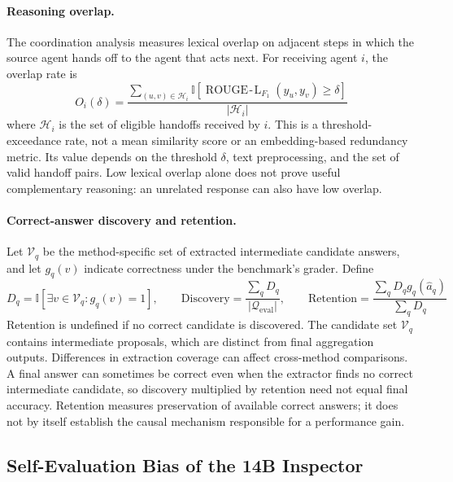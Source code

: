 \paragraph{Reasoning overlap.}
The coordination analysis measures lexical overlap on adjacent steps in which the source agent hands off to the agent that acts next. For receiving agent $i$, the overlap rate is
\begin{equation}
 O_i(\delta)=
 \frac{\sum_{(u,v)\in\mathcal{H}_i}
  \mathbb{I}[\operatorname{ROUGE\!\text{-}\!L}_{F_1}(y_u,y_v)\geq\delta]}
 {|\mathcal{H}_i|}
 \label{eq:app-overlap}
\end{equation}
where $\mathcal{H}_i$ is the set of eligible handoffs received by $i$. This is a threshold-exceedance rate, not a mean similarity score or an embedding-based redundancy metric. Its value depends on the threshold $\delta$, text preprocessing, and the set of valid handoff pairs. Low lexical overlap alone does not prove useful complementary reasoning: an unrelated response can also have low overlap.

\paragraph{Correct-answer discovery and retention.}
Let $\mathcal{V}_q$ be the method-specific set of extracted intermediate candidate answers, and let $g_q(v)$ indicate correctness under the benchmark's grader. Define
\begin{equation}
 D_q=\mathbb{I}[\exists v\in\mathcal{V}_q:g_q(v)=1],
 \qquad
 \mathrm{Discovery}=\frac{\sum_q D_q}{|\mathcal{Q}_{\mathrm{eval}}|},
 \qquad
 \mathrm{Retention}=\frac{\sum_q D_q g_q(\widehat{a}_q)}{\sum_q D_q}
 \label{eq:app-retention}
\end{equation}
Retention is undefined if no correct candidate is discovered. The candidate set $\mathcal{V}_q$ contains intermediate proposals, which are distinct from final aggregation outputs. Differences in extraction coverage can affect cross-method comparisons. A final answer can sometimes be correct even when the extractor finds no correct intermediate candidate, so discovery multiplied by retention need not equal final accuracy. Retention measures preservation of available correct answers; it does not by itself establish the causal mechanism responsible for a performance gain.

\subsection{Self-Evaluation Bias of the 14B Inspector}
\label{app:inspector_bias}

